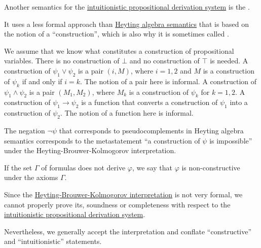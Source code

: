 \begin{definition}\label{def:brouwer_heyting_kolmogorov_interpretation}
  Another semantics for the \hyperref[def:intuitionistic_propositional_derivation_system]{intuitionistic propositional derivation system} is the .

  It uses a less formal approach than \hyperref[def:propositional_heyting_algebra_semantics]{Heyting algebra semantics} that is based on the notion of a \enquote{construction}, which is also why it is sometimes called .

  \begin{thmenum}
     We assume that we know what constitutes a construction of propositional variables.
     There is no construction of \( \bot \) and no construction of \( \top \) is needed.
     A construction of \( \psi_1 \vee \psi_2 \) is a pair \( (i, M) \), where \( i = 1, 2 \) and \( M \) is a construction of \( \psi_k \) if and only if \( i = k \). The notion of a pair here is informal.
     A construction of \( \psi_1 \wedge \psi_2 \) is a pair \( (M_1, M_2) \), where \( M_k \) is a construction of \( \psi_k \) for \( k = 1, 2 \).
     A construction of \( \psi_1 \rightarrow \psi_2 \) is a function that converts a construction of \( \psi_1 \) into a construction of \( \psi_2 \). The notion of a function here is informal.
  \end{thmenum}

  The negation \( \neg\psi \) that corresponds to pseudocomplements in Heyting algebra semantics corresponds to the metastatement \enquote{a construction of \( \psi \) is impossible} under the Heyting-Brouwer-Kolmogorov interpretation.

  If the set \( \Gamma \) of formulas does not derive \( \varphi \), we say that \( \varphi \) is non-constructive under the axioms \( \Gamma \).
\end{definition}

\begin{remark}\label{rem:brouwer_heyting_kolmogorov_interpretation_compatibility}
  Since the \hyperref[def:brouwer_heyting_kolmogorov_interpretation]{Heyting-Brouwer-Kolmogorov interpretation} is not very formal, we cannot properly prove its, soundness or completeness with respect to the \hyperref[def:intuitionistic_propositional_derivation_system]{intuitionistic propositional derivation system}.

  Nevertheless, we generally accept the interpretation and conflate \enquote{constructive} and \enquote{intuitionistic} statements.
\end{remark}

